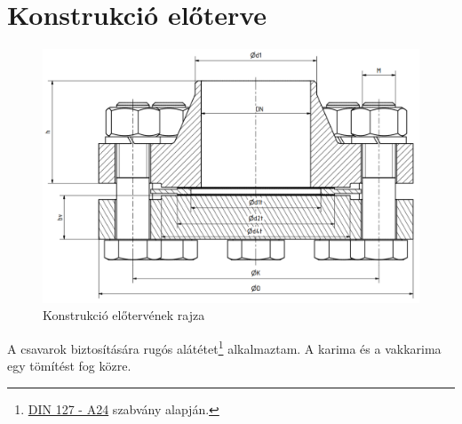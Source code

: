 \section{Konstrukció előterve}

\begin{figure}[hbt!]
	\centering
	\includegraphics[scale=.45]{./images/assembly-preplan.png}
	\caption{Konstrukció előtervének rajza}
\end{figure}

A csavarok biztosítására rugós alátétet\footnote{\href{https://www.aspenfasteners.com/content/pdf/Metric_DIN_127_spec.pdf}{DIN 127 - A24} szabvány alapján.} alkalmaztam. A karima és a vakkarima egy tömítést fog közre.
